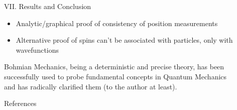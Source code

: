 \documentclass[final,hyperref={pdfpagelabels=false}]{beamer}
\begin{document}
\begin{frame}[t]
\begin{columns}[c]
\begin{column}{.69\textwidth}
\begin{columns}[b]
\begin{column}{.47\textwidth}
\begin{block}{VII. Results and Conclusion}
\begin{itemize}
{\begin{itemize}
                \item Analytic/graphical proof of consistency of position measurements
                \item Alternative proof of spins can't be associated with particles, only with wavefunctions
              \end{itemize}}
            \end{itemize}
            Bohmian Mechanics, being a deterministic and precise theory, has been successfully used to probe fundamental concepts in Quantum Mechanics and has radically clarified them (to the author at least).

          \end{block}



          \begin{block}{References}
            \begin{multicols}{2}
            {\fontsize{20.5}{10}
              }
            \end{multicols}
          \end{block}



        \end{column}

        \begin{column}{.015\textwidth}\end{column} %
      \end{columns}

    \end{column}



    \begin{column}{.015\textwidth}\end{column} %

  \end{columns} %


\end{frame} %
\end{document}
